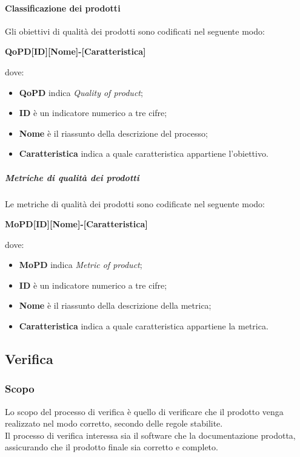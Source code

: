 \documentclass[../norme-di-progetto.tex]{subfiles}
\begin{document}
\paragraph{Classificazione dei prodotti}
Gli obiettivi di qualità dei prodotti sono codificati nel seguente modo: \\
\begin{center}
  \centering
  \textbf{QoPD[ID][Nome]-[Caratteristica]}
\end{center} dove:
\begin{itemize}
  \item \textbf{QoPD} indica \textit{Quality of product};
  \item \textbf{ID} è un indicatore numerico a tre cifre;
  \item \textbf{Nome} è il riassunto della descrizione del processo;
  \item \textbf{Caratteristica} indica a quale caratteristica appartiene l'obiettivo.
\end{itemize}

\subparagraph{Metriche di qualità dei prodotti}
Le metriche di qualità dei prodotti sono codificate nel seguente modo:
\begin{center}
  \centering
  \textbf{MoPD[ID][Nome]-[Caratteristica]}
\end{center} dove:
\begin{itemize}
  \item \textbf{MoPD} indica \textit{Metric of product};
  \item \textbf{ID} è un indicatore numerico a tre cifre;
  \item \textbf{Nome} è il riassunto della descrizione della metrica;
  \item \textbf{Caratteristica} indica a quale caratteristica appartiene la metrica.
\end{itemize}

\subsection{Verifica}

\subsubsection{Scopo}
Lo scopo del processo di verifica è quello di verificare che il prodotto venga realizzato nel modo corretto, secondo delle regole stabilite. \\
Il processo di verifica interessa sia il software che la documentazione prodotta, assicurando che il prodotto finale sia corretto e completo.
\end{document}
